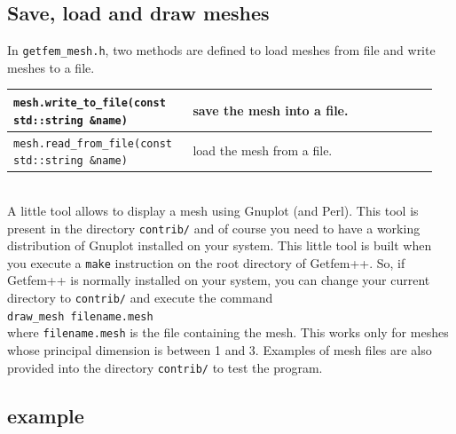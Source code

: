 \documentclass[11pt,a4paper]{article}
\begin{document}
\subsection{Save, load and draw meshes}

In {\tt getfem\_mesh.h}, two methods are defined to load meshes from file and write meshes to a file. \\[0.5cm]
\begin{tabular}{|m{0.4\linewidth}|m{0.55\linewidth}|}\hline

  {\tt mesh.write\_to\_file(const std::string \&name)} & save the mesh into a file.\\ \hline

  {\tt mesh.read\_from\_file(const std::string \&name)} & load the mesh from a file.\\ \hline

\end{tabular} \\[0.5cm]

A little tool allows to display a mesh using Gnuplot (and Perl). This tool is present in the directory {\tt contrib/} and of course you need to have a working distribution of Gnuplot installed on your system. This little tool is built when you execute a {\tt make} instruction on the root directory of {\sc Getfem++}. So, if {\sc Getfem++} is normally installed on your system, you can change your current directory to {\tt contrib/} and execute the command \\[0.5cm]
{\tt draw\_mesh filename.mesh} \\[0.5cm]
where {\tt filename.mesh} is the file containing the mesh. This works only for meshes whose principal dimension is between 1 and 3. Examples of mesh files are also provided into the directory {\tt contrib/} to test the program.

\subsection{example}
\end{document}
